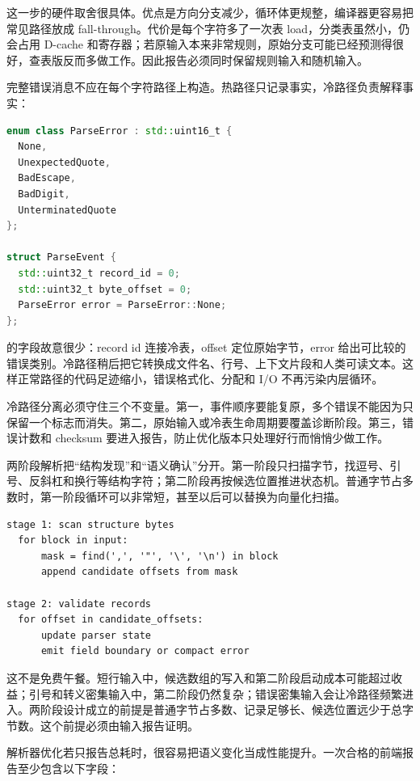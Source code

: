 这一步的硬件取舍很具体。优点是方向分支减少，循环体更规整，编译器更容易把常见路径放成 fall-through。代价是每个字符多了一次表 load，分类表虽然小，仍会占用 D-cache 和寄存器；若原输入本来非常规则，原始分支可能已经预测得很好，查表版反而多做工作。因此报告必须同时保留规则输入和随机输入。

完整错误消息不应在每个字符路径上构造。热路径只记录事实，冷路径负责解释事实：

\begin{lstlisting}[language=C++,caption={热路径只输出紧凑解析事件}]
enum class ParseError : std::uint16_t {
  None,
  UnexpectedQuote,
  BadEscape,
  BadDigit,
  UnterminatedQuote
};

struct ParseEvent {
  std::uint32_t record_id = 0;
  std::uint32_t byte_offset = 0;
  ParseError error = ParseError::None;
};
\end{lstlisting}

 的字段故意很少：record id 连接冷表，offset 定位原始字节，error 给出可比较的错误类别。冷路径稍后把它转换成文件名、行号、上下文片段和人类可读文本。这样正常路径的代码足迹缩小，错误格式化、分配和 I/O 不再污染内层循环。

冷路径分离必须守住三个不变量。第一，事件顺序要能复原，多个错误不能因为只保留一个标志而消失。第二，原始输入或冷表生命周期要覆盖诊断阶段。第三，错误计数和 checksum 要进入报告，防止优化版本只处理好行而悄悄少做工作。

两阶段解析把“结构发现”和“语义确认”分开。第一阶段只扫描字节，找逗号、引号、反斜杠和换行等结构字符；第二阶段再按候选位置推进状态机。普通字节占多数时，第一阶段循环可以非常短，甚至以后可以替换为向量化扫描。

\begin{lstlisting}[numbers=none,caption={两阶段解析的控制流形状}]
stage 1: scan structure bytes
  for block in input:
      mask = find(',', '"', '\', '\n') in block
      append candidate offsets from mask

stage 2: validate records
  for offset in candidate_offsets:
      update parser state
      emit field boundary or compact error
\end{lstlisting}

这不是免费午餐。短行输入中，候选数组的写入和第二阶段启动成本可能超过收益；引号和转义密集输入中，第二阶段仍然复杂；错误密集输入会让冷路径频繁进入。两阶段设计成立的前提是普通字节占多数、记录足够长、候选位置远少于总字节数。这个前提必须由输入报告证明。

解析器优化若只报告总耗时，很容易把语义变化当成性能提升。一次合格的前端报告至少包含以下字段：

